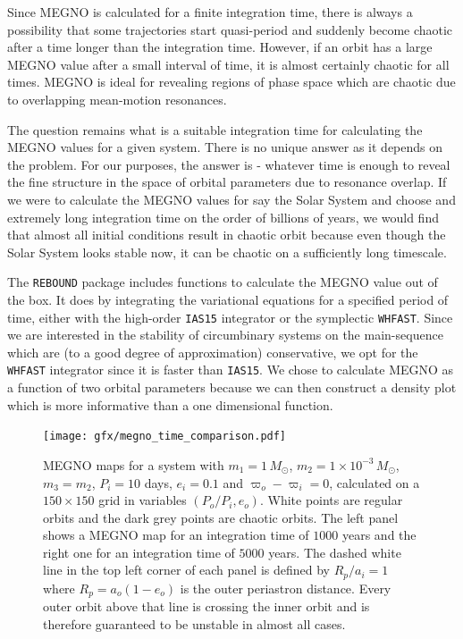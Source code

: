 \documentclass[twoside,openright,titlepage,numbers=noenddot,headinclude,%
                footinclude=true,cleardoublepage=empty,abstractoff, 
                BCOR=5mm,paper=a4,fontsize=11pt,%
                american,%
                ]{scrreprt}%
\begin{document}
Since MEGNO is calculated for a finite integration
time, there
is always a possibility that some trajectories start quasi-period and suddenly
become chaotic after a time longer than the integration time. However, if an orbit
has a large MEGNO value after a small interval of time, it 
is almost certainly chaotic for all times. MEGNO is ideal for revealing 
regions of phase space which are chaotic due to overlapping mean-motion resonances.

The question remains what is a suitable integration time for calculating the 
MEGNO values for a given system. There is no unique answer as it depends on 
the problem. For our purposes, the answer is  - whatever time is enough 
to reveal the fine structure in the space of orbital parameters 
due to resonance overlap. If we were to calculate the MEGNO values
for say the Solar System and choose and extremely long integration time
on the order of billions of years, we would find that almost all initial
conditions result in chaotic orbit because even though the Solar System looks
stable now, it can be chaotic on a sufficiently long timescale.

The \texttt{REBOUND} package includes functions to calculate
the MEGNO value out of the box. It does by integrating the variational equations
for a specified period of time, either with the high-order \texttt{IAS15} 
integrator or the symplectic \texttt{WHFAST}. Since we are interested
in the stability of circumbinary systems on the main-sequence which are
(to a good degree of approximation) conservative, we opt for the 
\texttt{WHFAST} integrator since it is faster than \texttt{IAS15}. We chose
to calculate MEGNO as a function of two orbital parameters because we can 
then construct a density plot which is more informative than a one 
dimensional function.
\begin{figure}[htb]
\centering
\texttt{[image: gfx/megno\_time\_comparison.pdf]}
    \caption[MEGNO maps for different integration itmes.]{MEGNO maps for a 
    system with 
    $m_1=1\,M_\odot$, $m_2=1\times 10^{-3}\,M_\odot$, $m_3=m_2$,
    $P_i=10$ days, $e_i=0.1$ and $\varpi_o-\varpi_i=0$, calculated 
    on a $150\times 150$
    grid in variables $(P_o/P_i,e_o)$. White points are regular orbits
    and the dark grey points are chaotic orbits. The left panel
    shows a MEGNO map for an integration time of $1000$ years and the
    right one for an integration time of $5000$ years. The dashed white line in
    the top left corner of each panel is defined 
    by $R_p/a_i=1$ where $R_p=a_o(1-e_o)$
    is the outer periastron distance. Every outer orbit above that line
    is crossing the inner orbit and is therefore guaranteed to be 
    unstable in almost all cases.}
\label{fig:megno_example}
\end{figure}
\end{document}
